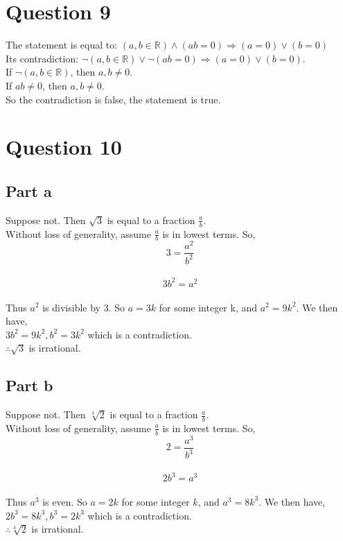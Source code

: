 \documentclass[11pt, oneside]{article}   	%
\begin{document}
\section*{Question 9}

   The statement is equal to: $(a, b\in \mathbb{R})\wedge (ab=0)\Rightarrow (a=0)\vee (b=0)$\\
   Its contradiction: $\lnot (a, b\in \mathbb{R})\vee \lnot(ab=0)\Rightarrow (a=0)\vee (b=0)$.\\
   If $\lnot (a, b\in \mathbb{R})$, then $a, b\neq 0$.\\
   If $ab\neq 0$, then $a,b\neq 0$.\\
   So the contradiction is false, the statement is true.

\section*{Question 10}

   \subsection*{Part a}
   Suppose not. Then $\sqrt{3}$ is equal to a fraction $\frac{a}{b}$.\\
   Without loss of generality, assume $\frac{a}{b}$ is in lowest terms. So,\\
   $$3=\frac{a^{2}}{b^{2}}$$\\
   $$3b^{2}=a^{2}$$\\
   Thus $a^{2}$ is divisible by 3. So $a=3k$ for some integer k, and $a^{2}=9k^{2}$. We then have,\\
   $3b^{2}=9k^{2}, b^{2}=3k^{2}$ which is a contradiction.\\
   $\therefore \sqrt{3}$ is irrational.

   \subsection*{Part b}
   Suppose not. Then $\sqrt[3]{2}$ is equal to a fraction $\frac{a}{b}$.\\
   Without loss of generality, assume $\frac{a}{b}$ is in lowest terms. So,\\
   $$2=\frac{a^{3}}{b^{3}}$$\\
   $$2b^{3}=a^{3}$$\\
   Thus $a^{3}$ is even. So $a=2k$ for some integer $k$, and $a^{3}=8k^{3}$. We then have,\\
   $2b^{3}=8k^{3}, b^{3}=2k^{3}$ which is a contradiction.\\
   $\therefore \sqrt[3]{2}$ is irrational.
\end{document}
